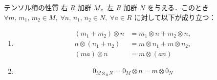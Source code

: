 \documentclass[algtopo_main]{subfiles}
\begin{document}
\begin{mylem}[label=lem:tensor1]{テンソル積の性質}
	右 $R$ 加群 $M$，左 $R$ 加群 $N$ を与える．このとき $\forall m,\, m_1,\, m_2 \in M,\; \forall n,\, n_1,\, n_2 \in N,\; \forall a \in R$ に対して以下が成り立つ：
	\begin{enumerate}
		\item 
		\begin{align}
			(m_1 + m_2) \otimes n &= m_1 \otimes n + m_2 \otimes n, \\
			n \otimes (n_1 + n_2) &= m \otimes n_1 + m \otimes n_2, \\
			(ma) \otimes n &= m \otimes (an)
		\end{align}
		\item 
		\begin{align}
			0_{M \otimes_R N} = 0_M \otimes n = m \otimes 0_N
		\end{align}
	\end{enumerate}
\end{mylem}
\end{document}
